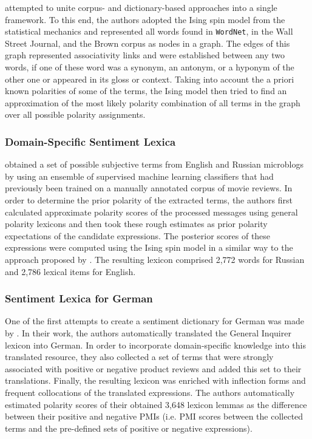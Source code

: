 \citet{Takamura:05} attempted to unite corpus- and dictionary-based
approaches into a single framework.  To this end, the authors adopted
the Ising spin model from the statistical mechanics and represented
all words found in \texttt{WordNet}, in the Wall Street Journal, and
the Brown corpus as nodes in a graph.  The edges of this graph
represented associativity links and were established between any two
words, if one of these word was a synonym, an antonym, or a hyponym of
the other one or appeared in its gloss or context.  Taking into
account the a priori known polarities of some of the terms, the Ising
model then tried to find an approximation of the most likely polarity
combination of all terms in the graph over all possible polarity
assignments.

\subsubsection{Domain-Specific Sentiment Lexica}

\citet{Chetviorkin:14} obtained a set of possible subjective terms
from English and Russian microblogs by using an ensemble of supervised
machine learning classifiers that had previously been trained on a
manually annotated corpus of movie reviews.  In order to determine the
prior polarity of the extracted terms, the authors first calculated
approximate polarity scores of the processed messages using general
polarity lexicons and then took these rough estimates as prior
polarity expectations of the candidate expressions.  The posterior
scores of these expressions were computed using the Ising spin model
in a similar way to the approach proposed by \citet{Takamura:05}.  The
resulting lexicon comprised 2,772 words for Russian and 2,786 lexical
items for English.

\subsubsection{Sentiment Lexica for German}

One of the first attempts to create a sentiment dictionary for German
was made by \citet{Remus:10}.  In their work, the authors
automatically translated the General Inquirer lexicon \citep{Stone:66}
into German.  In order to incorporate domain-specific knowledge into
this translated resource, they also collected a set of terms that were
strongly associated with positive or negative product reviews and
added this set to their translations.  Finally, the resulting lexicon
was enriched with inflection forms and frequent collocations of the
translated expressions.  The authors automatically estimated polarity
scores of their obtained 3,648 lexicon lemmas as the difference
between their positive and negative PMIs (i.e. PMI scores between the
collected terms and the pre-defined sets of positive or negative
expressions).

